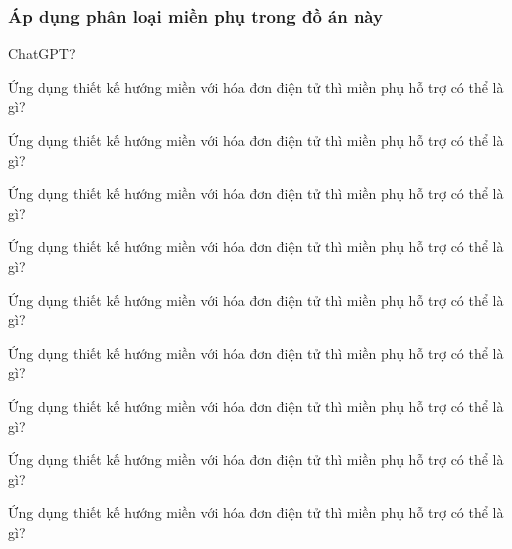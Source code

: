 
\subsubsection{Áp dụng phân loại miền phụ trong đồ án này}

ChatGPT?

















Ứng dụng thiết kế hướng miền với hóa đơn điện tử thì miền phụ hỗ trợ có thể là gì?

Ứng dụng thiết kế hướng miền với hóa đơn điện tử thì miền phụ hỗ trợ có thể là gì?

Ứng dụng thiết kế hướng miền với hóa đơn điện tử thì miền phụ hỗ trợ có thể là gì?

Ứng dụng thiết kế hướng miền với hóa đơn điện tử thì miền phụ hỗ trợ có thể là gì?

Ứng dụng thiết kế hướng miền với hóa đơn điện tử thì miền phụ hỗ trợ có thể là gì?

Ứng dụng thiết kế hướng miền với hóa đơn điện tử thì miền phụ hỗ trợ có thể là gì?

Ứng dụng thiết kế hướng miền với hóa đơn điện tử thì miền phụ hỗ trợ có thể là gì?

Ứng dụng thiết kế hướng miền với hóa đơn điện tử thì miền phụ hỗ trợ có thể là gì?

Ứng dụng thiết kế hướng miền với hóa đơn điện tử thì miền phụ hỗ trợ có thể là gì?

